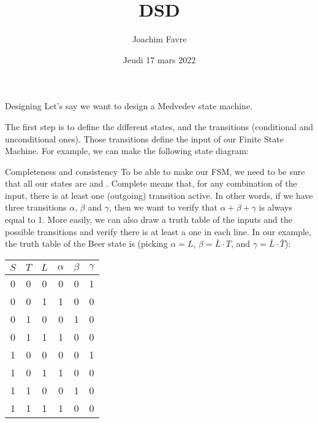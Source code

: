 \documentclass[a4paper]{article}
\title{DSD}
\author{Joachim Favre}
\date{Jeudi 17 mars 2022}
\begin{document}
\maketitle


\begin{parag}{Designing}
    Let's say we want to design a Medvedev state machine. 

    The first step is to define the different states, and the transitions (conditional and unconditional ones). Those transitions define the input of our Finite State Machine. For example, we can make the following state diagram:

    \begin{subparag}{Completeness and consistency}
        To be able to make our FSM, we need to be sure that all our states are  and . Complete means that, for any combination of the input, there is at least one (outgoing) transition active. In other words, if we have three transitions $\alpha$, $\beta$ and $\gamma$, then we want to verify that $\alpha + \beta + \gamma$ is always equal to 1. More easily, we can also draw a truth table of the inputs and the possible transitions and verify there is at least a one in each line. In our example, the truth table of the Beer state is (picking $\alpha = L$, $\beta = \bar{L} \cdot T$, and $\gamma = \bar{L} \cdot \bar{T}$):
        \begin{center}
        \begin{tabular}{ccc|ccc}
            $S$ & $T$ & $L$ & $\alpha$ & $\beta$ & $\gamma$ \\
            \hline
            0 & 0 & 0 & 0 & 0 & 1 \\
            0 & 0 & 1 & 1 & 0 & 0 \\
            0 & 1 & 0 & 0 & 1 & 0 \\
            0 & 1 & 1 & 1 & 0 & 0 \\
            1 & 0 & 0 & 0 & 0 & 1 \\
            1 & 0 & 1 & 1 & 0 & 0 \\
            1 & 1 & 0 & 0 & 1 & 0 \\
            1 & 1 & 1 & 1 & 0 & 0 \\
        \end{tabular}
        \end{center}
        

\end{subparag}
\end{parag}
\end{document}
